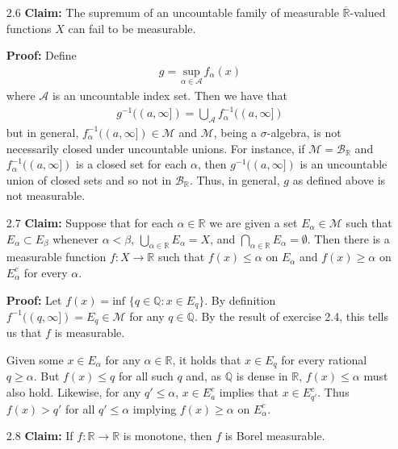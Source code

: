 \documentclass[11pt,letter]{article}
\begin{document}
\begin{enumerate}
    \item [2.6] \textbf{Claim:} The supremum of an uncountable family of measurable $\overline{\mathbb{R}}$-valued functions $X$ can fail to be measurable.
    
    \textbf{Proof:} Define 
    \begin{align*}
        g = \underset{\alpha \in \mathcal{A}}{\text{ sup }} f_\alpha(x)
    \end{align*} 
    where $\mathcal{A}$ is an uncountable index set. Then we have that
    \begin{align*}
        g^{-1} ((a,\infty]) = \bigcup_{\mathcal{A}} f_\alpha^{-1} ((a,\infty])
    \end{align*}
    but in general, $f_\alpha^{-1} ((a,\infty]) \in \mathcal{M}$ and $\mathcal{M}$, being a $\sigma$-algebra, is not necessarily closed under uncountable unions. For instance, if $\mathcal{M} = \mathcal{B}_{\mathbb{R}}$ and $f_\alpha^{-1} ((a,\infty])$ is a closed set for each $\alpha$, then $g^{-1}((a,\infty])$ is an uncountable union of closed sets and so not in $\mathcal{B}_{\mathbb{R}}$. Thus, in general, $g$ as defined above is not measurable.

    \item [2.7] \textbf{Claim:} Suppose that for each $\alpha \in \mathbb{R}$ we are given a set $E_\alpha \in \mathcal{M}$ such that $E_\alpha \subset E_\beta$ whenever $\alpha < \beta$, $\bigcup_{\alpha \in \mathbb{R}} E_\alpha = X$, and $\bigcap_{\alpha \in \mathbb{R}} E_\alpha = \emptyset$. Then there is a measurable function $f: X \rightarrow \mathbb{R}$ such that $f(x) \le \alpha$ on $E_\alpha$ and $f(x) \ge \alpha$ on $E_\alpha^c$ for every $\alpha$.
    
    \textbf{Proof:} Let $f(x) = \text{inf }\{q \in \mathbb{Q}:x \in E_q\}$. By definition $f^{-1}((q,\infty]) = E_q \in \mathcal{M}$ for any $q \in \mathbb{Q}$. By the result of exercise 2.4, this tells us that $f$ is measurable.

    Given some $x \in E_\alpha$ for any $\alpha \in \mathbb{R}$, it holds that $x \in E_q$ for every rational $q \ge \alpha$. But $f(x) \le q$ for all such $q$ and, as $\mathbb{Q}$ is dense in $\mathbb{R}$, $f(x) \le \alpha$ must also hold. Likewise, for any $q' \le \alpha$, $x \in E_a^c$ implies that $x \in E_{q'}^c$. Thus $f(x) > q'$ for all $q' \le \alpha$ implying $f(x) \ge \alpha$ on $E_\alpha^c$.

    \item [2.8] \textbf{Claim:} If $f:\mathbb{R} \rightarrow \mathbb{R}$ is monotone, then $f$ is Borel measurable.
    

\end{enumerate}
\end{document}
